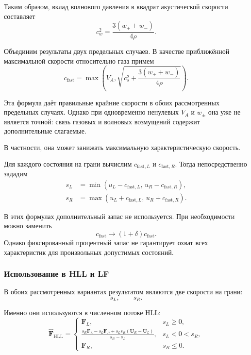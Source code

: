 \documentclass[11pt,a4paper]{article}
\providecommand{\U}{}
\renewcommand{\U}{\bm U}
\newcommand{\F}{\bm F}
\begin{document}
Таким образом, вклад волнового давления
в квадрат акустической скорости составляет
\[
c_w^2=\frac{3(w_++w_-)}{4\rho}.
\]

Объединим результаты двух предельных случаев.
В качестве приближённой максимальной скорости
относительно газа примем
\begin{equation*}
{
c_{\mathrm{fast}}=
\max\left(
V_A,\sqrt{c_s^2+\frac{3(w_++w_-)}{4\rho}}
\right).
}
\end{equation*}

Эта формула даёт правильные крайние скорости
в обоих рассмотренных предельных случаях.
Однако при одновременно ненулевых $V_A$
и $w_\pm$ она уже не является точной:
связь газовых и волновых возмущений
содержит дополнительные слагаемые.

В частности, она может занижать максимальную
характеристическую скорость.

Для каждого состояния на грани вычислим
$c_{\mathrm{fast},L}$ и $c_{\mathrm{fast},R}$.
Тогда непосредственно зададим
\begin{equation*}
{
\begin{aligned}
s_L&=\min\left(
u_L-c_{\mathrm{fast},L},\,
u_R-c_{\mathrm{fast},R}
\right),\\[3pt]
s_R&=\max\left(
u_L+c_{\mathrm{fast},L},\,
u_R+c_{\mathrm{fast},R}
\right).
\end{aligned}
}
\end{equation*}

В этих формулах дополнительный запас
не используется. При необходимости
можно заменить
\[
c_{\mathrm{fast}}
\longrightarrow
(1+\delta)c_{\mathrm{fast}}.
\]
Однако фиксированный процентный запас
не гарантирует охват всех характеристик
для произвольных допустимых состояний.

\subsubsection{Использование в HLL и LF}

В обоих рассмотренных вариантах результатом
являются две скорости на грани:
\[
\boxed{s_L,\qquad s_R.}
\]

Именно они используются в численном потоке HLL:
\[
\widehat{\F}_{\mathrm{HLL}}=
\begin{cases}
\F_L,&s_L\ge0,\\[3pt]
\displaystyle
\frac{
s_R\F_L-s_L\F_R+s_Ls_R(\U_R-\U_L)
}{s_R-s_L},
&s_L<0<s_R,\\[8pt]
\F_R,&s_R\le0.
\end{cases}
\]
\end{document}
